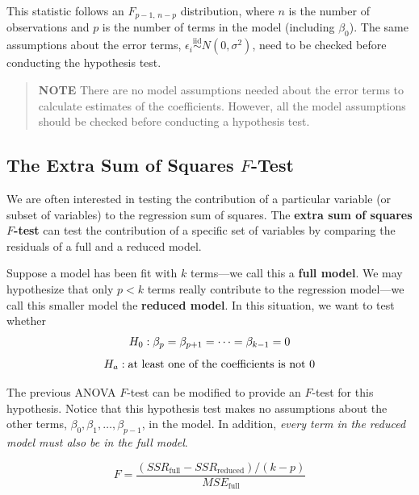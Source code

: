 \documentclass[
]{book}
\begin{document}
This statistic follows an \(F_{p-1,\,n-p}\) distribution, where \(n\) is the number of observations and \(p\) is the number of terms in the model (including \(\beta_0\)). The same assumptions about the error terms, \(\epsilon_i \overset{\mathrm{iid}}{\sim}N(0,\sigma^2)\), need to be checked before conducting the hypothesis test.

\begin{quote}
\textbf{NOTE} There are no model assumptions needed about the error terms to calculate estimates of the coefficients. However, all the model assumptions should be checked before conducting a hypothesis test.
\end{quote}

\hypertarget{the-extra-sum-of-squares-f-test}{%
\subsection*{\texorpdfstring{The Extra Sum of Squares \(F\)-Test}{The Extra Sum of Squares F-Test}}\label{the-extra-sum-of-squares-f-test}}

We are often interested in testing the contribution of a particular variable (or subset of variables) to the regression sum of squares. The \textbf{extra sum of squares \(F\)-test} can test the contribution of a specific set of variables by comparing the residuals of a full and a reduced model.

Suppose a model has been fit with \(k\) terms---we call this a \textbf{full model}. We may hypothesize that only \(p < k\) terms really contribute to the regression model---we call this smaller model the \textbf{reduced model}. In this situation, we want to test whether
\begin{equation}
H_0: \beta_p = \beta_{p+1} = \dots = \beta_{k-1} = 0 
\notag
\end{equation}
\begin{equation}
H_a: \text{at least one of the coefficients is not }0 
\notag
\end{equation}

The previous ANOVA \(F\)-test can be modified to provide an \(F\)-test for this hypothesis. Notice that this hypothesis test makes no assumptions about the other terms, \(\beta_0, \beta_1, \dots, \beta_{p-1}\), in the model. In addition, \emph{every term in the reduced model must also be in the full model}.

\begin{equation}
 F = \frac{(SSR_{\text{full}} - SSR_{\text{reduced}})/(k - p)}{MSE_{\text{full}}}
 \tag{3.12}
\end{equation}
\end{document}
